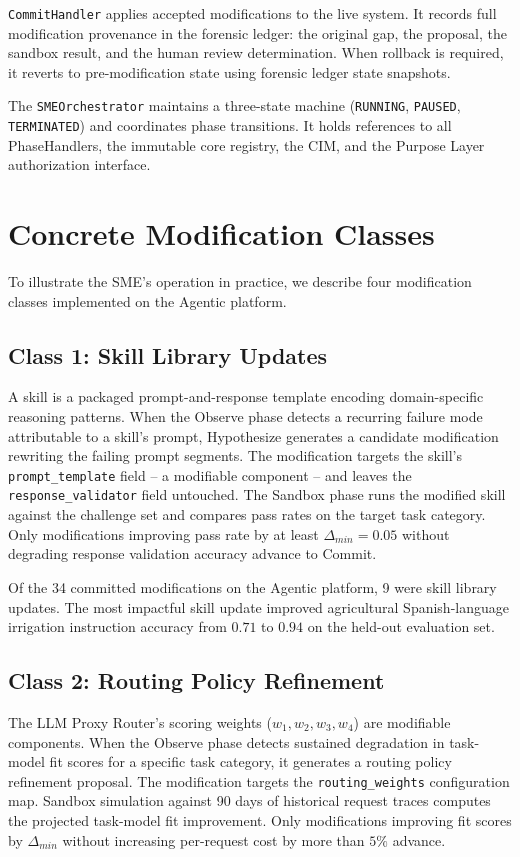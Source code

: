 \documentclass[12pt]{article}
\begin{document}
\medskip
\noindent
\texttt{CommitHandler} applies accepted modifications to the live system. It records full modification provenance in the forensic ledger: the original gap, the proposal, the sandbox result, and the human review determination. When rollback is required, it reverts to pre-modification state using forensic ledger state snapshots.

The \texttt{SMEOrchestrator} maintains a three-state machine (\texttt{RUNNING}, \texttt{PAUSED}, \texttt{TERMINATED}) and coordinates phase transitions. It holds references to all PhaseHandlers, the immutable core registry, the CIM, and the Purpose Layer authorization interface.



\section{Concrete Modification Classes}
\label{sec:mod-classes}

To illustrate the SME's operation in practice, we describe four modification classes implemented on the Agentic platform.

\subsection{Class 1: Skill Library Updates}
A skill is a packaged prompt-and-response template encoding domain-specific reasoning patterns. When the Observe phase detects a recurring failure mode attributable to a skill's prompt, Hypothesize generates a candidate modification rewriting the failing prompt segments. The modification targets the skill's \texttt{prompt\_template} field -- a modifiable component -- and leaves the \texttt{response\_validator} field untouched. The Sandbox phase runs the modified skill against the challenge set and compares pass rates on the target task category. Only modifications improving pass rate by at least $\Delta_{min} = 0.05$ without degrading response validation accuracy advance to Commit.

Of the 34 committed modifications on the Agentic platform, 9 were skill library updates. The most impactful skill update improved agricultural Spanish-language irrigation instruction accuracy from $0.71$ to $0.94$ on the held-out evaluation set.

\subsection{Class 2: Routing Policy Refinement}
The LLM Proxy Router's scoring weights ($w_1, w_2, w_3, w_4$) are modifiable components. When the Observe phase detects sustained degradation in task-model fit scores for a specific task category, it generates a routing policy refinement proposal. The modification targets the \texttt{routing\_weights} configuration map. Sandbox simulation against 90 days of historical request traces computes the projected task-model fit improvement. Only modifications improving fit scores by $\Delta_{min}$ without increasing per-request cost by more than $5\%$ advance.
\end{document}
